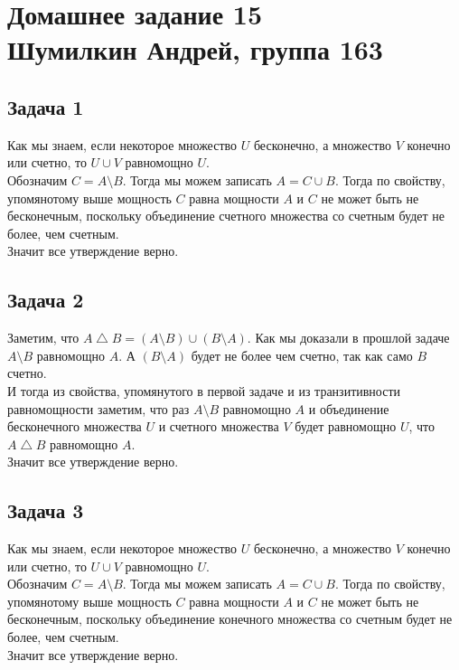 

	\section{Домашнее задание 15\\ Шумилкин Андрей, группа 163} 
	\subsection{Задача 1}
	Как мы знаем, если некоторое множество $U$ бесконечно, а множество $V$ конечно или счетно, то $U \cup V$ равномощно $U$. \\
	Обозначим $C = A\setminus B$. Тогда мы можем записать $A = C \cup B$. Тогда по свойству, упомянотому выше мощность $C$ равна мощности $A$ и $C$ не может быть не бесконечным, поскольку объединение счетного множества со счетным будет не более, чем счетным. \\
	Значит все утверждение верно. 
	
	\subsection{Задача 2}
	Заметим, что $A \bigtriangleup B = (A \setminus B) \cup (B \setminus A)$. Как мы доказали в прошлой задаче $A \setminus B$ равномощно $A$. А $(B \setminus A)$ будет не более чем счетно, так как само $B$ счетно. \\
	И тогда из свойства, упомянутого в первой задаче и из транзитивности равномощности заметим, что раз $A \setminus B$ равномощно $A$ и  объединение бесконечного множества $U$ и счетного множества $V$ будет равномощно $U$, что $A \bigtriangleup B$ равномощно $A$. \\
	Значит все утверждение верно.
	
	\subsection{Задача 3}
	Как мы знаем, если некоторое множество $U$ бесконечно, а множество $V$ конечно или счетно, то $U \cup V$ равномощно $U$. \\
	Обозначим $C = A\setminus B$. Тогда мы можем записать $A = C \cup B$. Тогда по свойству, упомянотому выше мощность $C$ равна мощности $A$ и $C$ не может быть не бесконечным, поскольку объединение конечного множества со счетным будет не более, чем счетным. \\
	Значит все утверждение верно. 
	
